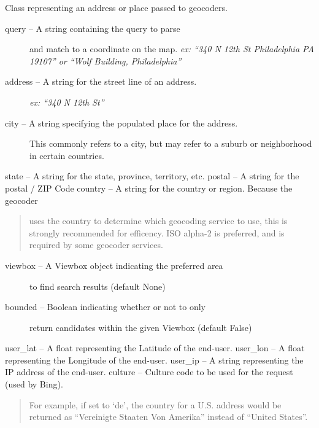 \documentclass[letterpaper,10pt,english]{sphinxmanual}
\begin{document}
\begin{fulllineitems}
\label{index:omgeo.places.PlaceQuery}
Class representing an address or place passed to geocoders.
\begin{description}
\item[{query       --  A string containing the query to parse}] \leavevmode
and match to a coordinate on the map.
\emph{ex: ``340 N 12th St Philadelphia PA 19107''
or ``Wolf Building, Philadelphia''}

\item[{address     --  A string for the street line of an address.}] \leavevmode
\emph{ex: ``340 N 12th St''}

\item[{city        --  A string specifying the populated place for the address.}] \leavevmode
This commonly refers to a city, but may refer to a suburb
or neighborhood in certain countries.

\end{description}

state       --  A string for the state, province, territory, etc.
postal      --  A string for the postal / ZIP Code
country     --  A string for the country or region. Because the geocoder
\begin{quote}

uses the country to determine which geocoding service to use,
this is strongly recommended for efficency. ISO alpha-2 is
preferred, and is required by some geocoder services.
\end{quote}
\begin{description}
\item[{viewbox     --  A Viewbox object indicating the preferred area}] \leavevmode
to find search results (default None)

\item[{bounded     --  Boolean indicating whether or not to only}] \leavevmode
return candidates within the given Viewbox (default False)

\end{description}

user\_lat    --  A float representing the Latitude of the end-user.
user\_lon    --  A float representing the Longitude of the end-user.
user\_ip     --  A string representing the IP address of the end-user.
culture     --  Culture code to be used for the request (used by Bing).
\begin{quote}

For example, if set to `de', the country for a U.S. address
would be returned as ``Vereinigte Staaten Von Amerika''
instead of ``United States''.
\end{quote}

\end{fulllineitems}
\end{document}
